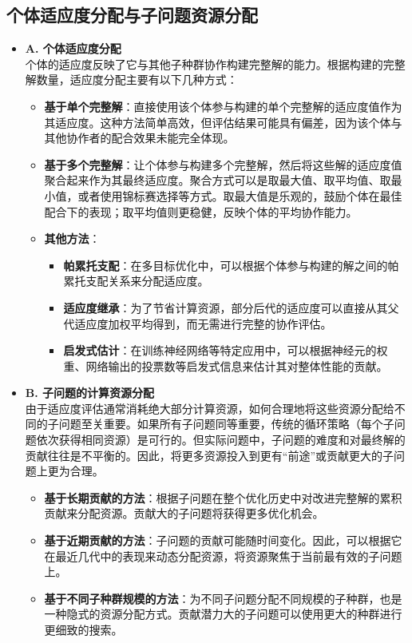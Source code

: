 \subsection{个体适应度分配与子问题资源分配}
    \begin{itemize}
        \item \textbf{A. 个体适应度分配} \\
        个体的适应度反映了它与其他子种群协作构建完整解的能力。根据构建的完整解数量，适应度分配主要有以下几种方式：
        \begin{itemize}
            \item \textbf{基于单个完整解}：直接使用该个体参与构建的单个完整解的适应度值作为其适应度。这种方法简单高效，但评估结果可能具有偏差，因为该个体与其他协作者的配合效果未能完全体现。
            \item \textbf{基于多个完整解}：让个体参与构建多个完整解，然后将这些解的适应度值聚合起来作为其最终适应度。聚合方式可以是取最大值、取平均值、取最小值，或者使用锦标赛选择等方式。取最大值是乐观的，鼓励个体在最佳配合下的表现；取平均值则更稳健，反映个体的平均协作能力。
            \item \textbf{其他方法}：
            \begin{itemize}
                \item \textbf{帕累托支配}：在多目标优化中，可以根据个体参与构建的解之间的帕累托支配关系来分配适应度。
                \item \textbf{适应度继承}：为了节省计算资源，部分后代的适应度可以直接从其父代适应度加权平均得到，而无需进行完整的协作评估。
                \item \textbf{启发式估计}：在训练神经网络等特定应用中，可以根据神经元的权重、网络输出的投票数等启发式信息来估计其对整体性能的贡献。
            \end{itemize}
        \end{itemize}
        \item \textbf{B. 子问题的计算资源分配} \\
        由于适应度评估通常消耗绝大部分计算资源，如何合理地将这些资源分配给不同的子问题至关重要。如果所有子问题同等重要，传统的循环策略（每个子问题依次获得相同资源）是可行的。但实际问题中，子问题的难度和对最终解的贡献往往是不平衡的。因此，将更多资源投入到更有“前途”或贡献更大的子问题上更为合理。
        \begin{itemize}
            \item \textbf{基于长期贡献的方法}：根据子问题在整个优化历史中对改进完整解的累积贡献来分配资源。贡献大的子问题将获得更多优化机会。
            \item \textbf{基于近期贡献的方法}：子问题的贡献可能随时间变化。因此，可以根据它在最近几代中的表现来动态分配资源，将资源聚焦于当前最有效的子问题上。
            \item \textbf{基于不同子种群规模的方法}：为不同子问题分配不同规模的子种群，也是一种隐式的资源分配方式。贡献潜力大的子问题可以使用更大的种群进行更细致的搜索。
        \end{itemize}
    \end{itemize}

